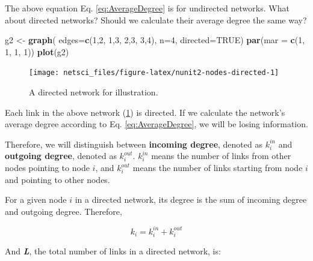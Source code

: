 \documentclass[
]{krantz}
\makeatletter
\newenvironment{Shaded}{\begin{snugshade}}{\end{snugshade}}
\newcommand{\DataTypeTok}[1]{\textcolor[rgb]{0.27,0.27,0.27}{#1}}
\newcommand{\DecValTok}[1]{\textcolor[rgb]{0.06,0.06,0.06}{#1}}
\newcommand{\KeywordTok}[1]{\textcolor[rgb]{0.27,0.27,0.27}{\textbf{#1}}}
\newcommand{\NormalTok}[1]{#1}
\newcommand{\OtherTok}[1]{\textcolor[rgb]{0.37,0.37,0.37}{#1}}
\newcommand{\StringTok}[1]{\textcolor[rgb]{0.5,0.5,0.5}{#1}}
\newenvironment{kframe}{%
\medskip{}
\setlength{\fboxsep}{.8em}
 \def\at@end@of@kframe{}%
 \ifinner\ifhmode%
  \def\at@end@of@kframe{\end{minipage}}%
  \begin{minipage}{\columnwidth}%
 \fi\fi%
 \def\FrameCommand##1{\hskip\@totalleftmargin \hskip-\fboxsep
 \colorbox{shadecolor}{##1}\hskip-\fboxsep
     \hskip-\linewidth \hskip-\@totalleftmargin \hskip\columnwidth}%
 \MakeFramed {\advance\hsize-\width
   \@totalleftmargin\z@ \linewidth\hsize
   \@setminipage}}%
 {\par\unskip\endMakeFramed%
 \at@end@of@kframe}
\renewenvironment{Shaded}{\begin{kframe}}{\end{kframe}}
\makeatother
\begin{document}
The above equation Eq. \eqref{eq:AverageDegree} is for undirected networks. What about directed networks? Should we calculate their average degree the same way?

\begin{Shaded}
\begin{Highlighting}[]
\NormalTok{g2 <-}\StringTok{ }\KeywordTok{graph}\NormalTok{( }\DataTypeTok{edges=}\KeywordTok{c}\NormalTok{(}\DecValTok{1}\NormalTok{,}\DecValTok{2}\NormalTok{, }\DecValTok{1}\NormalTok{,}\DecValTok{3}\NormalTok{, }\DecValTok{2}\NormalTok{,}\DecValTok{3}\NormalTok{, }\DecValTok{3}\NormalTok{,}\DecValTok{4}\NormalTok{), }\DataTypeTok{n=}\DecValTok{4}\NormalTok{, }\DataTypeTok{directed=}\OtherTok{TRUE}\NormalTok{)}
\KeywordTok{par}\NormalTok{(}\DataTypeTok{mar =} \KeywordTok{c}\NormalTok{(}\DecValTok{1}\NormalTok{, }\DecValTok{1}\NormalTok{, }\DecValTok{1}\NormalTok{, }\DecValTok{1}\NormalTok{))}
\KeywordTok{plot}\NormalTok{(g2)}
\end{Highlighting}
\end{Shaded}

\begin{figure}

{\centering \texttt{[image: netsci\_files/figure-latex/nunit2-nodes-directed-1]} 

}

\caption{A directed network for illustration.}\label{fig:nunit2-nodes-directed}
\end{figure}

Each link in the above network (\ref{fig:nunit2-nodes-directed}) is directed. If we calculate the network's average degree according to Eq. \eqref{eq:AverageDegree}, we will be losing information.

Therefore, we will distinguish between \textbf{incoming degree}, denoted as \(k_i^{in}\) and \textbf{outgoing degree}, denoted as \(k_i^{out}\). \(k_i^{in}\) means the number of links from other nodes pointing to node \(i\), and \(k_i^{out}\) means the number of links starting from node \(i\) and pointing to other nodes.

For a given node \(i\) in a directed network, its degree is the sum of incoming degree and outgoing degree. Therefore,

\begin{equation} 
  k_i = k_i^{in} + k_i^{out} \label{eq:degree-directed}
\end{equation}

And \textbf{\emph{L}}, the total number of links in a directed network, is:
\end{document}
